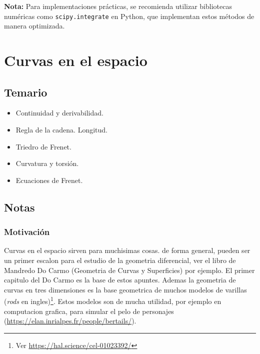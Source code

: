 \documentclass[11pt]{book}
\theoremstyle{definicion}
\theoremstyle{teorema}
\theoremstyle{ejemplo}
\begin{document}
\medskip 

\noindent
\textbf{Nota:} Para implementaciones prácticas, se recomienda utilizar bibliotecas numéricas como \texttt{scipy.integrate} en Python, que implementan estos métodos de manera optimizada.

\chapter{Curvas en el espacio} %

\section{Temario}

\begin{itemize}
    \item Continuidad y derivabilidad. 
    \item Regla de la cadena. Longitud.
    \item Triedro de Frenet. \item Curvatura y torsión. \item Ecuaciones de Frenet.

\end{itemize}

\section{Notas}


\subsection{Motivación}

Curvas en el espacio sirven para muchisimas cosas.
de forma general, pueden ser un primer escalon para el estudio de la geometria diferencial, ver el libro de Mandredo Do Carmo (Geometria de Curvas y Superficies) por ejemplo. El primer capitulo del Do Carmo es la base de estos apuntes. %
%
%
%
%
Ademas la geometria de curvas en tres dimensiones es la base geometrica de muchos modelos de varillas
(\emph{rods} en ingles)\footnote{Ver \url{https://hal.science/cel-01023392/}}. Estos modelos son de mucha utilidad, por ejemplo 
en computacion grafica, para simular el pelo de personajes (\url{https://elan.inrialpes.fr/people/bertails/}).
\end{document}

